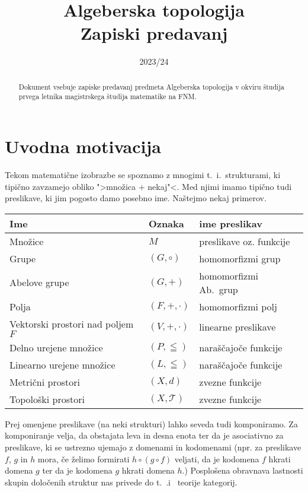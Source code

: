 \documentclass[a4paper, 10pt]{article}
\title{Algeberska topologija\\ Zapiski predavanj}
\date{2023/24}
\begin{document}
	\maketitle
	\newpage
	\begin{abstract}
		\noindent Dokument vsebuje zapiske predavanj predmeta Algeberska topologija v okviru študija prvega letnika magistrskega študija matematike na FNM.
	\end{abstract}
	\tableofcontents
	\newpage
	\section{Uvodna motivacija}
	Tekom matematične izobrazbe se spoznamo z mnogimi t.~i.~strukturami, ki tipično zavzamejo obliko ">množica $+$ nekaj"<. Med njimi imamo tipično tudi preslikave, ki jim pogosto damo posebno ime. Naštejmo nekaj primerov.
	\begin{table}[h!]
		\centering
		\begin{tabular}{|l|l|l|}
			Ime & Oznaka & ime preslikav \\\hline
			Množice & $M$ & preslikave oz. funkcije \\\hline
			Grupe & $(G, \circ)$ & homomorfizmi grup \\\hline
			Abelove grupe & $(G, +)$ & homomorfizmi Ab.~grup \\\hline
			Polja & $(F, +, \cdot)$ & homomorfizmi polj \\\hline
			Vektorski prostori nad poljem $F$ & $(V, +, \cdot)$ & linearne preslikave \\\hline
			Delno urejene množice & $(P, \leqq)$ & naraščajoče funkcije \\\hline
			Linearno urejene množice & $(L, \leqq)$ & naraščajoče funkcije \\\hline
			Metrični prostori & $(X, d)$ & zvezne funkcije \\\hline
			Topološki prostori & $(X, \mathcal{T})$ & zvezne funkcije \\\hline
		\end{tabular}
	\end{table}
	Prej omenjene preslikave (na neki strukturi) lahko seveda tudi komponiramo. Za komponiranje velja, da obstajata leva in desna enota ter da je asociativno za preslikave, ki se ustrezno ujemajo z domenami in kodomenami (npr. za preslikave $f$, $g$ in $h$ mora, če želimo formirati $h\circ (g \circ f)$ veljati, da je kodomena $f$ hkrati domena $g$ ter da je kodomena $g$ hkrati domena $h$.)
	Posplošena obravnava lastnosti skupin določenih struktur nas privede do t.~.i~ teorije kategorij.
	
\end{document}
